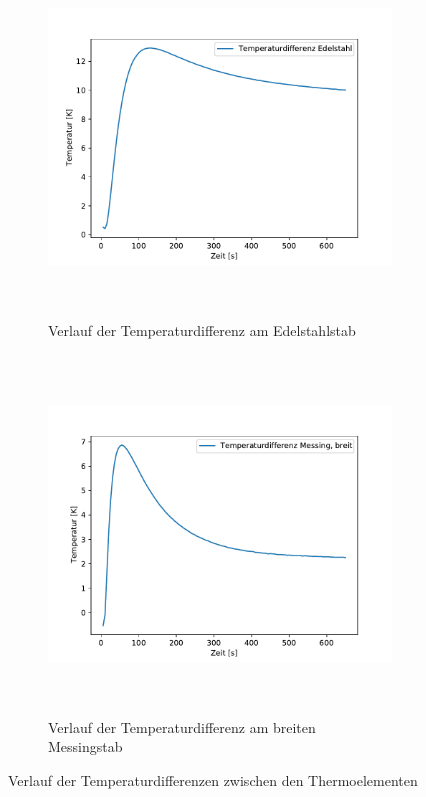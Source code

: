 \begin{figure}[!htbp]
  \begin{subfigure}{\textwidth}
  \centering
  \includegraphics[height=9.5cm]{content/differenz_edel.pdf}
  \caption{Verlauf der Temperaturdifferenz am Edelstahlstab}
  \label{fig:diff_edel}
\end{subfigure}
\begin{subfigure}{\textwidth}
  \centering
  \includegraphics[height=9.5cm]{content/differenz_mess.pdf}
  \caption{Verlauf der Temperaturdifferenz am breiten Messingstab}
  \label{fig:diff_mess}
\end{subfigure}
\caption{Verlauf der Temperaturdifferenzen zwischen den Thermoelementen}
\label{fig:diff}
\end{figure}


